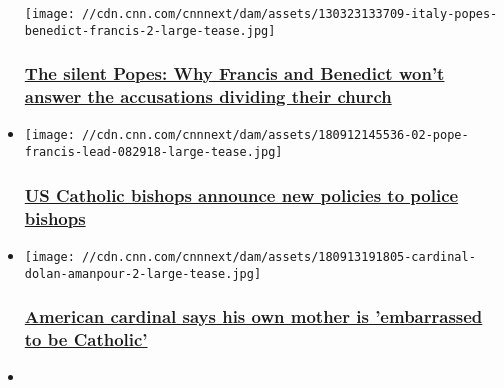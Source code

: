 \begin{itemize}
  \texttt{[image: //cdn.cnn.com/cnnnext/dam/assets/130323133709-italy-popes-benedict-francis-2-large-tease.jpg]}

  \hypertarget{the-silent-popes-why-francis-and-benedict-wont-answer-the-accusations-dividing-their-church}{%
  \subsubsection{\texorpdfstring{\href{/2018/09/23/europe/silent-popes/index.html}{The
  silent Popes: Why Francis and Benedict won't answer the accusations
  dividing their
  church}}{The silent Popes: Why Francis and Benedict won't answer the accusations dividing their church}}\label{the-silent-popes-why-francis-and-benedict-wont-answer-the-accusations-dividing-their-church}}
\item
  \href{/2018/09/19/us/catholic-bishops-new-abuse-policy/index.html}{}

  \texttt{[image: //cdn.cnn.com/cnnnext/dam/assets/180912145536-02-pope-francis-lead-082918-large-tease.jpg]}

  \hypertarget{us-catholic-bishops-announce-new-policies-to-police-bishops}{%
  \subsubsection{\texorpdfstring{\href{/2018/09/19/us/catholic-bishops-new-abuse-policy/index.html}{US
  Catholic bishops announce new policies to police
  bishops}}{US Catholic bishops announce new policies to police bishops}}\label{us-catholic-bishops-announce-new-policies-to-police-bishops}}
\item
  \href{/2018/09/13/us/dolan-amanpour-cnntv/index.html}{}

  \texttt{[image: //cdn.cnn.com/cnnnext/dam/assets/180913191805-cardinal-dolan-amanpour-2-large-tease.jpg]}

  \hypertarget{american-cardinal-says-his-own-mother-is-embarrassed-to-be-catholic-}{%
  \subsubsection{\texorpdfstring{\href{/2018/09/13/us/dolan-amanpour-cnntv/index.html}{American
  cardinal says his own mother is 'embarrassed to be Catholic'
  }}{American cardinal says his own mother is 'embarrassed to be Catholic' }}\label{american-cardinal-says-his-own-mother-is-embarrassed-to-be-catholic-}}
\item
  \href{/2018/08/27/us/vigano-pope-resign-abuse-analysis/index.html}{}


\end{itemize}
